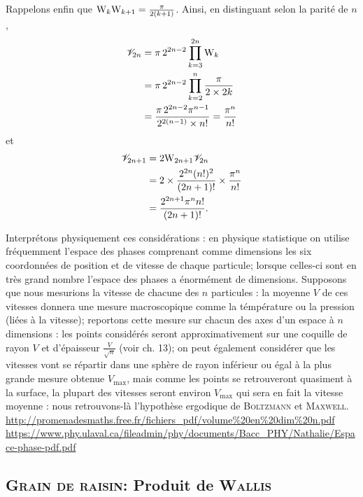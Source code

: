 \begin{preuve}
\begin{enumerate}
Rappelons enfin que $\mathrm{W}_k \mathrm{W}_{k+1} = \frac{\pi}{2(k+1)}$. Ainsi, en distinguant selon la parité de $n$,
\begin{align*}
\mathscr{V}_{2n}
&= \pi\, 2^{2n-2} \prod_{k=3}^{2n} \mathrm{W}_k\\
&= \pi\, 2^{2n-2} \prod_{k=2}^{n} \frac{\pi}{2 \times 2 k}\\
&= \frac{\pi\, 2^{2n-2} \pi^{n-1}}{2^{2(n-1)} \times n!}
= \frac{\pi^n}{n!}
\end{align*}
et
\begin{align*}
\mathscr{V}_{2n+1}
&= 2 \mathrm{W}_{2n+1} \mathscr{V}_{2n}\\
&= 2 \times \frac{2^{2n} (n!)^2}{(2n+1)!} \times \frac{\pi^n}{n!}\\
&= \frac{2^{2n+1} \pi^n n!}{(2n+1)!}.
\end{align*}
\end{enumerate}
\end{preuve}

\begin{remarque}
Interprétons physiquement ces considérations : en physique statistique on utilise fréquemment l'espace des phases comprenant comme dimensions les six coordonnées de position et de vitesse de chaque particule; lorsque celles-ci sont en très grand nombre l'espace des phases a énormément de dimensions. Supposons que nous mesurions la vitesse de chacune des $n$ particules : la moyenne $V$ de ces vitesses donnera une mesure macroscopique comme la témpérature ou la pression (liées à la vitesse); reportons cette mesure sur chacun des axes d'un espace à $n$ dimensions : les points considérés seront approximativement sur une coquille de rayon $V$ et d'épaisseur $\frac{V}{\sqrt{n}}$ (voir ch. 13); on peut également considérer que les vitesses vont se répartir dans une sphère de rayon inférieur ou égal à la plus grande mesure obtenue $V_\mathrm{max}$, mais comme les points se retrouveront quasiment à la surface, la plupart des vitesses seront environ $V_\mathrm{max}$ qui sera en fait la vitesse moyenne : nous retrouvons-là l'hypothèse ergodique de \textsc{Boltzmann} et \textsc{Maxwell}. \url{http://promenadesmaths.free.fr/fichiers_pdf/volume%20en%20dim%20n.pdf} \url{https://www.phy.ulaval.ca/fileadmin/phy/documents/Bacc_PHY/Nathalie/Espace-phase-pdf.pdf}
\end{remarque}




\subsection{\textsc{Grain de raisin}: Produit de \textsc{Wallis}}

